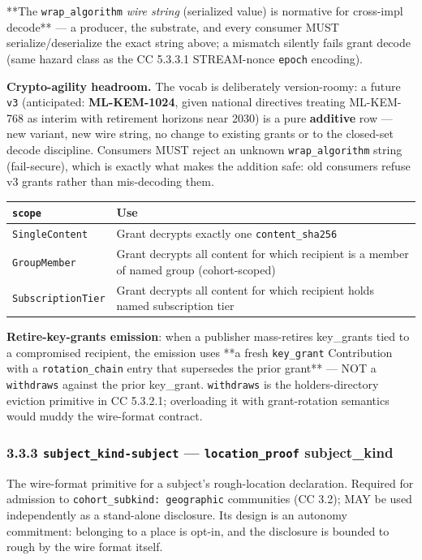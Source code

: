 \documentclass[11pt]{article}
\begin{document}
**The \texttt{wrap\_algorithm} \textit{wire string} (serialized value) is normative for cross-impl decode** — a producer, the substrate, and every consumer MUST serialize/deserialize the exact string above; a mismatch silently fails grant decode (same hazard class as the CC 5.3.3.1 STREAM-nonce \texttt{epoch} encoding).


\textbf{Crypto-agility headroom.} The vocab is deliberately version-roomy: a future \texttt{v3} (anticipated: \textbf{ML-KEM-1024}, given national directives treating ML-KEM-768 as interim with retirement horizons near 2030) is a pure \textbf{additive} row — new variant, new wire string, no change to existing grants or to the closed-set decode discipline. Consumers MUST reject an unknown \texttt{wrap\_algorithm} string (fail-secure), which is exactly what makes the addition safe: old consumers refuse v3 grants rather than mis-decoding them.


{\footnotesize
\begin{longtable}{|p{8.0cm}|p{8.0cm}|}\hline
\textbf{\texttt{scope}} & \textbf{Use} \\ \hline\endhead
\texttt{SingleContent} & Grant decrypts exactly one \texttt{content\_sha256} \\ \hline
\texttt{GroupMember} & Grant decrypts all content for which recipient is a member of named group (cohort-scoped) \\ \hline
\texttt{SubscriptionTier} & Grant decrypts all content for which recipient holds named subscription tier \\ \hline
\end{longtable}}


\textbf{Retire-key-grants emission}: when a publisher mass-retires key\_grants tied to a compromised recipient, the emission uses **a fresh \texttt{key\_grant} Contribution with a \texttt{rotation\_chain} entry that supersedes the prior grant** — NOT a \texttt{withdraws} against the prior key\_grant. \texttt{withdraws} is the holders-directory eviction primitive in CC 5.3.2.1; overloading it with grant-rotation semantics would muddy the wire-format contract.


\subsubsection*{3.3.3 \texttt{subject\_kind-subject} — \texttt{location\_proof} subject\_kind}


The wire-format primitive for a subject's rough-location declaration. Required for admission to \texttt{cohort\_subkind: geographic} communities (CC 3.2); MAY be used independently as a stand-alone disclosure. Its design is an autonomy commitment: belonging to a place is opt-in, and the disclosure is bounded to rough by the wire format itself.
\end{document}
